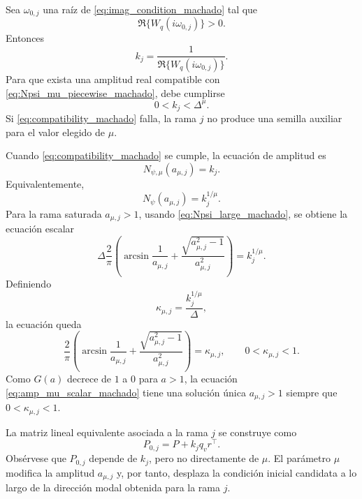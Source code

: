 Sea \(\omega_{0,j}\) una raíz de \eqref{eq:imag_condition_machado} tal que
\[
\Re\{W_q(i\omega_{0,j})\}>0.
\]
Entonces
\begin{equation}
\label{eq:kj_machado}
k_j
=
\frac{1}{\Re\{W_q(i\omega_{0,j})\}}.
\end{equation}
Para que exista una amplitud real compatible con
\eqref{eq:Npsi_mu_piecewise_machado}, debe cumplirse
\begin{equation}
\label{eq:compatibility_machado}
0<k_j<\Delta^\mu.
\end{equation}
Si \eqref{eq:compatibility_machado} falla, la rama \(j\) no produce una
semilla auxiliar para el valor elegido de \(\mu\).

Cuando \eqref{eq:compatibility_machado} se cumple, la ecuación de amplitud es
\begin{equation}
\label{eq:amp_mu_eq_machado}
N_{\psi,\mu}(a_{\mu,j})=k_j.
\end{equation}
Equivalentemente,
\begin{equation}
\label{eq:amp_mu_root_machado}
N_\psi(a_{\mu,j})
=
k_j^{1/\mu}.
\end{equation}
Para la rama saturada \(a_{\mu,j}>1\), usando
\eqref{eq:Npsi_large_machado}, se obtiene la ecuación escalar
\begin{equation}
\label{eq:amp_mu_explicit_machado}
\Delta
\frac{2}{\pi}
\left(
\arcsin\frac1{a_{\mu,j}}+
\frac{\sqrt{a_{\mu,j}^2-1}}{a_{\mu,j}^2}
\right)
=
k_j^{1/\mu}.
\end{equation}
Definiendo
\begin{equation}
\label{eq:Kmu_def_machado}
\kappa_{\mu,j}
=
\frac{k_j^{1/\mu}}{\Delta},
\end{equation}
la ecuación queda
\begin{equation}
\label{eq:amp_mu_scalar_machado}
\frac{2}{\pi}
\left(
\arcsin\frac1{a_{\mu,j}}+
\frac{\sqrt{a_{\mu,j}^2-1}}{a_{\mu,j}^2}
\right)
=
\kappa_{\mu,j},
\qquad
0<\kappa_{\mu,j}<1.
\end{equation}
Como \(G(a)\) decrece de \(1\) a \(0\) para \(a>1\), la ecuación
\eqref{eq:amp_mu_scalar_machado} tiene una solución única
\(a_{\mu,j}>1\) siempre que \(0<\kappa_{\mu,j}<1\).

La matriz lineal equivalente asociada a la rama \(j\) se construye como
\begin{equation}
\label{eq:P0_mu_machado}
P_{0,j}
=
P+k_jq_vr^\top.
\end{equation}
Obsérvese que \(P_{0,j}\) depende de \(k_j\), pero no directamente de
\(\mu\). El parámetro \(\mu\) modifica la amplitud \(a_{\mu,j}\) y, por
tanto, desplaza la condición inicial candidata a lo largo de la dirección
modal obtenida para la rama \(j\).

